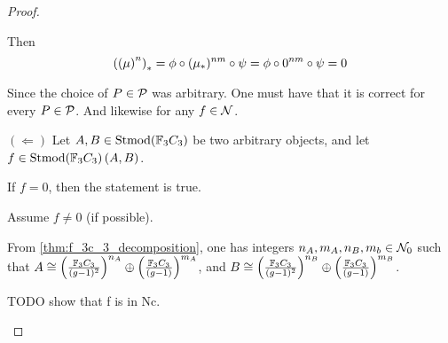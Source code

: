 \begin{proof}
\begin{enumerate}
{            Then
            \[
                \left( \left( \mu \right)^n \right)_* = \phi \circ (\mu_*)^{nm} \circ \psi = \phi \circ 0^{nm} \circ \psi = 0
            \]

            Since the choice of \( P \in {\mathcal{P}} \) was arbitrary. One must have that it is correct for every \( P \in {\mathcal{P}} \). And likewise for any \( f \in {\mathcal{N}} \).

            \( ( \Leftarrow ) \) Let \( A, B \in \operatorname{Stmod}({\mathbb{F}}_3C_3) \) be two arbitrary objects, and let \( f \in \operatorname{Stmod}({\mathbb{F}}_3C_3)\left( A, B \right) \).

            If \( f = 0 \), then the statement is true. 
            
            Assume \( f \neq 0 \) (if possible). %

            From \autoref{thm:f_3c_3_decomposition}, one has integers \( n_A, m_A, n_B, m_b \in {\mathcal{N}}_0 \) such that \( A \cong \left( \frac{{\mathbb{F}}_3C_3}{(g - 1)^2} \right)^{n_A} \oplus \left( \frac{{\mathbb{F}}_3C_3}{(g - 1)} \right)^{m_A} \), and \( B \cong \left( \frac{{\mathbb{F}}_3C_3}{(g - 1)^2} \right)^{n_B} \oplus \left( \frac{{\mathbb{F}}_3C_3}{(g - 1)} \right)^{m_B} \).

            TODO show that f is in Nc.
        }
    \end{enumerate}
\end{proof}